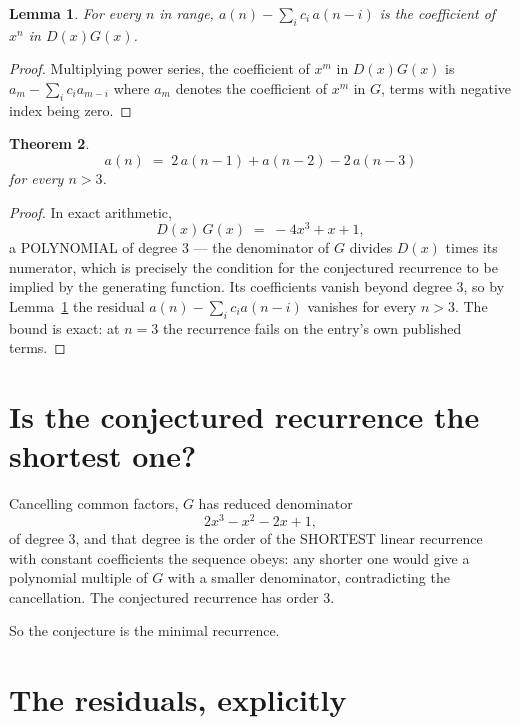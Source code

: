\documentclass[11pt,a4paper]{article}
\theoremstyle{plain}
\newtheorem{theorem}{Theorem}
\newtheorem{lemma}[theorem]{Lemma}
\theoremstyle{definition}
\begin{document}
\begin{lemma}\label{lem:key}
For every $n$ in range, $a(n)-\sum_i c_i\,a(n-i)$ is the coefficient of $x^{n}$ in
$D(x)G(x)$.
\end{lemma}

\begin{proof}
Multiplying power series, the coefficient of $x^{m}$ in $D(x)G(x)$ is
$a_m-\sum_i c_i a_{m-i}$ where $a_m$ denotes the coefficient of $x^{m}$ in $G$, terms with
negative index being zero.
\end{proof}

\begin{theorem}
\[
a(n)\;=\;2\,a(n-1) + a(n-2) - 2\,a(n-3)
\]
for every $n>3$.
\end{theorem}

\begin{proof}
In exact arithmetic,
\[
D(x)\,G(x)\;=\;- 4 x^{3} + x + 1,
\]
a POLYNOMIAL of degree $3$ --- the denominator of $G$ divides $D(x)$ times its numerator,
which is precisely the condition for the conjectured recurrence to be implied by the
generating function. Its coefficients vanish beyond degree $3$, so by
Lemma~\ref{lem:key} the residual $a(n)-\sum_ic_ia(n-i)$ vanishes for every
$n>3$. The bound is exact: at $n=3$ the recurrence fails on the entry's own published terms.
\end{proof}

\section{Is the conjectured recurrence the shortest one?}

Cancelling common factors, $G$ has reduced denominator
\[
2 x^{3} - x^{2} - 2 x + 1,
\]
of degree $3$, and that degree is the order of the SHORTEST linear recurrence with
constant coefficients the sequence obeys: any shorter one would give a polynomial multiple of
$G$ with a smaller denominator, contradicting the cancellation. The conjectured recurrence has
order $3$.

So the conjecture is the minimal recurrence.

\section{The residuals, explicitly}
\end{document}
